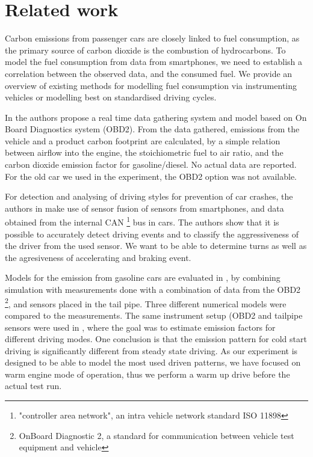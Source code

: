 \section{Related work}
\label{sec:relwork}
 Carbon emissions from passenger cars are closely linked to fuel consumption, as the primary source of carbon dioxide is the combustion of hydrocarbons. To model the fuel consumption from  data from smartphones, we need to establish a correlation between the observed data, and the consumed fuel. We provide an overview of existing methods for modelling fuel consumption via instrumenting vehicles or modelling best on standardised driving cycles.

In \cite{hilpert201} the authors propose a real time data gathering system and model based on On Board Diagnostics system (OBD2). From the data gathered, emissions from the vehicle and a product carbon footprint are calculated, by a simple relation between airflow into the engine, the stoichiometric fuel to air ratio, and the carbon dioxide emission factor for gasoline/diesel. No actual data are reported. For the old car we used in the experiment, the OBD2 option was not available. 

For detection and analysing of driving styles for prevention of car crashes, the authors in \cite{Johnson2011} make use of sensor fusion of sensors from smartphones, and data obtained from the internal CAN \footnote{"controller area network", an intra vehicle network standard ISO 11898} bus in cars. The authors show that it is possible to accurately detect driving events and to classify the aggressiveness of the driver from the used sensor. We want to be able to determine turns as well as the agresiveness of accelerating and braking event.

Models for the emission from gasoline cars are evaluated in \cite{Silva2006}, by combining simulation with measurements done with a combination of data from the OBD2 \footnote{OnBoard Diagnostic 2, a standard for communication between vehicle test equipment and vehicle}, and sensors placed in the tail pipe. Three different numerical models were compared to the measurements. The same instrument setup (OBD2 and tailpipe sensors were used in \cite{Frey}, where the goal was to estimate emission factors for different driving modes. One conclusion is that the emission pattern for cold start driving is significantly different from steady state driving. As our experiment is designed to be able to model the most used driven patterns, we have focused on warm engine mode of operation, thus we perform a warm up drive before the actual test run.

